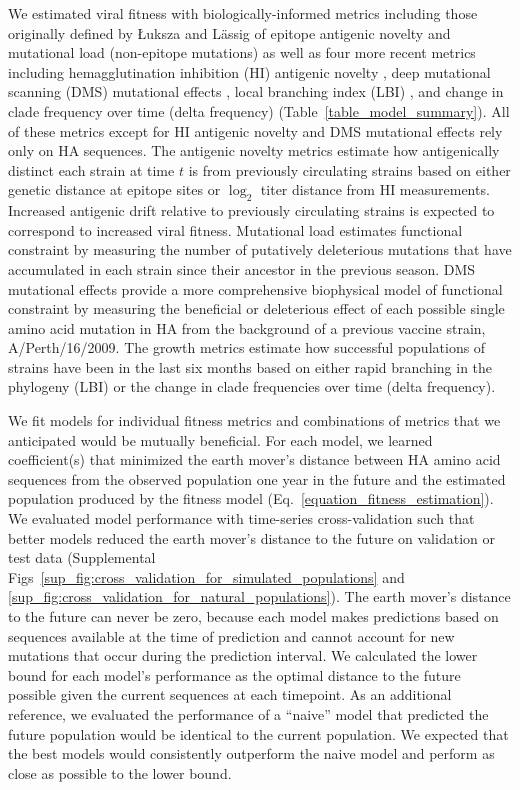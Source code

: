 We estimated viral fitness with biologically-informed metrics including those originally defined by {\L}uksza and L\"assig \cite{Luksza:2014hj} of epitope antigenic novelty and mutational load (non-epitope mutations) as well as four more recent metrics including hemagglutination inhibition (HI) antigenic novelty \cite{Neher:2016hy}, deep mutational scanning (DMS) mutational effects \cite{Lee2018}, local branching index (LBI) \cite{Neher:2014eu}, and change in clade frequency over time (delta frequency) (Table~\ref{table_model_summary}).
All of these metrics except for HI antigenic novelty and DMS mutational effects rely only on HA sequences.
The antigenic novelty metrics estimate how antigenically distinct each strain at time $t$ is from previously circulating strains based on either genetic distance at epitope sites or $\log_{2}$ titer distance from HI measurements.
Increased antigenic drift relative to previously circulating strains is expected to correspond to increased viral fitness.
Mutational load estimates functional constraint by measuring the number of putatively deleterious mutations that have accumulated in each strain since their ancestor in the previous season.
DMS mutational effects provide a more comprehensive biophysical model of functional constraint by measuring the beneficial or deleterious effect of each possible single amino acid mutation in HA from the background of a previous vaccine strain, A/Perth/16/2009.
The growth metrics estimate how successful populations of strains have been in the last six months based on either rapid branching in the phylogeny (LBI) or the change in clade frequencies over time (delta frequency).

We fit models for individual fitness metrics and combinations of metrics that we anticipated would be mutually beneficial.
For each model, we learned coefficient(s) that minimized the earth mover's distance between HA amino acid sequences from the observed population one year in the future and the estimated population produced by the fitness model (Eq.~\ref{equation_fitness_estimation}).
We evaluated model performance with time-series cross-validation such that better models reduced the earth mover's distance to the future on validation or test data (Supplemental Figs~\ref{sup_fig:cross_validation_for_simulated_populations} and \ref{sup_fig:cross_validation_for_natural_populations}).
The earth mover's distance to the future can never be zero, because each model makes predictions based on sequences available at the time of prediction and cannot account for new mutations that occur during the prediction interval.
We calculated the lower bound for each model's performance as the optimal distance to the future possible given the current sequences at each timepoint.
As an additional reference, we evaluated the performance of a ``naive'' model that predicted the future population would be identical to the current population.
We expected that the best models would consistently outperform the naive model and perform as close as possible to the lower bound.

